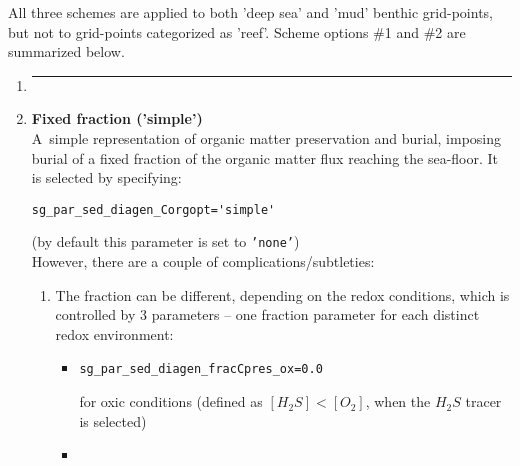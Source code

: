 \vspace{2mm}

All three schemes are applied to both 'deep sea' and 'mud' benthic grid-points, but not to grid-points categorized as 'reef'. Scheme options \#1 and \#2 are summarized below.

\vspace{2mm}

\begin{enumerate}

\item []\noindent\rule{4cm}{0.5pt}
\vspace{1mm}

\vspace{1mm}
\item \textbf{Fixed fraction ('simple')}
\vspace{1mm}
\\A\ simple  representation of organic matter preservation and burial, imposing burial of a fixed fraction of the organic matter flux reaching the sea-floor. It is selected by specifying:
\vspace{-0mm}\small\begin{verbatim}
sg_par_sed_diagen_Corgopt='simple'
\end{verbatim}\normalsize\vspace{-0mm}
(by default this parameter is set to \texttt{'none'})
\\However, there are a couple of complications/subtleties:
\begin{enumerate}
\vspace{1mm}
\item The fraction can be different, depending on the redox conditions, which is controlled by 3 parameters -- one fraction parameter for each distinct redox environment:
\begin{itemize}[noitemsep]
\vspace{1mm}
\item 
\vspace{-0mm}\small\begin{verbatim}
sg_par_sed_diagen_fracCpres_ox=0.0
\end{verbatim}\normalsize\vspace{-0mm}
for oxic conditions (defined as \([H_{2}S]<[O_{2}]\), when the \(H_{2}S\) tracer is selected)
\vspace{1mm}
\item 
\vspace{-0mm}\small\begin{verbatim}

\end{verbatim}
\end{itemize}
\end{enumerate}
\end{enumerate}
